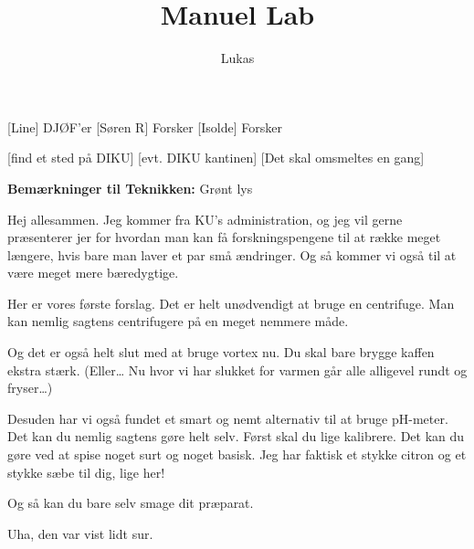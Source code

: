 \documentclass[a4paper,11pt]{article}
\title{Manuel Lab}
\author{Lukas}
\begin{document}
\maketitle

\begin{roles}
   [Line] DJØF'er
[Søren R] Forsker
[Isolde] Forsker

\end{roles}

\begin{props}
   [find et sted på DIKU]
[evt. DIKU kantinen]
[Det skal omsmeltes en gang]

\end{props}

\textbf{Bemærkninger til Teknikken:} Grønt lys

\begin{sketch}


 Hej allesammen. Jeg kommer fra KU’s administration, og jeg vil gerne præsenterer jer for hvordan man kan få forskningspengene til at række meget længere, hvis bare man laver et par små ændringer. Og så kommer vi også til at være meget mere bæredygtige.


 Her er vores første forslag. Det er helt unødvendigt at bruge en centrifuge. Man kan nemlig sagtens centrifugere på en meget nemmere måde.


 Og det er også helt slut med at bruge vortex nu. Du skal bare brygge kaffen ekstra stærk. (Eller… Nu hvor vi har slukket for varmen går alle alligevel rundt og fryser…)



 Desuden har vi også fundet et smart og nemt alternativ til at bruge pH-meter. Det kan du nemlig sagtens gøre helt selv. Først skal du lige kalibrere. Det kan du gøre ved at spise noget surt og noget basisk. Jeg har faktisk et stykke citron og et stykke sæbe til dig, lige her!


 Og så kan du bare selv smage dit præparat.


 Uha, den var vist lidt sur.


\end{sketch}
\end{document}
